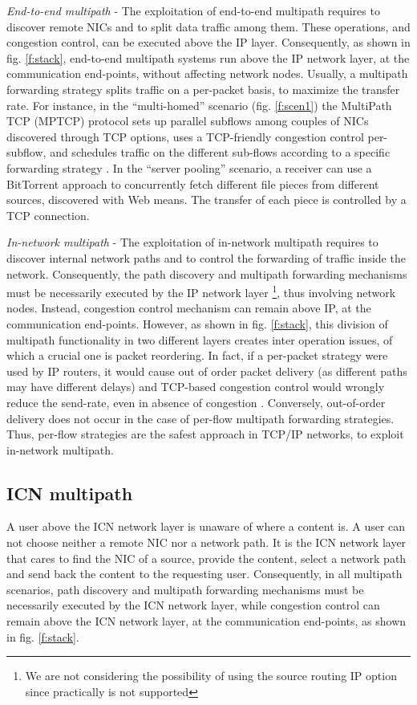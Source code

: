 \documentclass{sig-alternate-10pt}
\begin{document}
\emph{End-to-end multipath} - The exploitation of end-to-end multipath requires to discover remote NICs and to split data traffic among them. These operations, and congestion control, can be executed above the IP layer. Consequently, as shown in fig. \ref{f:stack}, end-to-end multipath systems run above the IP network layer, at the communication end-points, without affecting network nodes. Usually, a multipath forwarding strategy splits traffic on a per-packet basis, to maximize the transfer rate. For instance, in the ``multi-homed'' scenario (fig. \ref{f:scen1}) the MultiPath TCP (MPTCP) protocol \cite{rfc6824} sets up parallel subflows among couples of NICs discovered through TCP options, uses a TCP-friendly congestion control per-subflow, and schedules traffic on the different sub-flows according to a specific forwarding strategy \cite{singh2012performance,wischik2011design}. In the ``server pooling'' scenario, a receiver can use a BitTorrent approach to concurrently fetch different file pieces from different sources, discovered with Web means. The transfer of each piece is controlled by a TCP connection.

\emph{In-network multipath} - The exploitation of in-network multipath requires to discover internal network paths and to control the forwarding of traffic inside the network. Consequently, the path discovery and multipath forwarding mechanisms must be necessarily executed by the IP network layer \footnote{We are not considering the possibility of using the source routing IP option since practically is not supported}, thus involving network nodes. Instead, congestion control mechanism can remain above IP, at the communication end-points. However, as shown in fig. \ref{f:stack}, this division of multipath functionality in two different layers creates inter operation issues, of which a crucial one is packet reordering. In fact, if a per-packet strategy were used by IP routers, it would cause out of order packet delivery (as different paths may have different delays) and TCP-based congestion control would wrongly reduce the send-rate, even in absence of congestion \cite{lim2003tcp}. Conversely, out-of-order delivery does not occur in the case of per-flow multipath forwarding strategies. Thus, per-flow strategies are the safest approach in TCP/IP networks, to exploit in-network multipath.

\subsection*{ICN multipath}
A user above the ICN network layer is unaware of where a content is. A user can not choose neither a remote NIC nor a network path. It is the ICN network layer that cares to find the NIC of a source, provide the content, select a network path and send back the content to the requesting user. Consequently, in all multipath scenarios, path discovery and multipath forwarding mechanisms must be necessarily executed by the ICN network layer, while congestion control can remain above the ICN network layer, at the communication end-points, as shown in fig. \ref{f:stack}.
\end{document}
